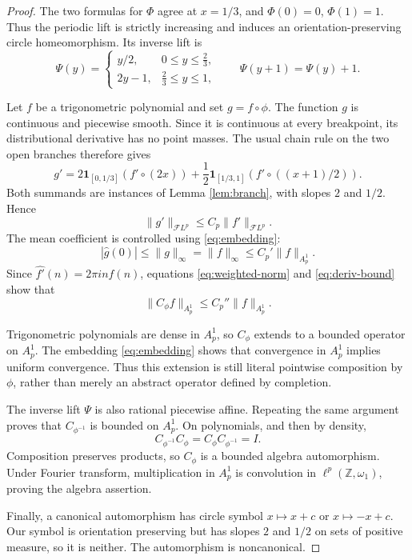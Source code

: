 \documentclass[11pt]{article}
\newcommand{\Z}{\mathbb Z}
\newcommand{\FL}{\mathcal F L}
\newcommand{\one}{\mathbf 1}
\begin{document}
\begin{proof}
The two formulas for $\Phi$ agree at $x=1/3$, and
$\Phi(0)=0$, $\Phi(1)=1$.  Thus the periodic lift is strictly increasing and
induces an orientation-preserving circle homeomorphism.  Its inverse lift is
\[
 \Psi(y)=
 \begin{cases}
   y/2,&0\le y\le \frac23,\\[1mm]
   2y-1,&\frac23\le y\le1,
 \end{cases}
 \qquad \Psi(y+1)=\Psi(y)+1.
\]

Let $f$ be a trigonometric polynomial and set $g=f\circ\phi$.  The function
$g$ is continuous and piecewise smooth.  Since it is continuous at every
breakpoint, its distributional derivative has no point masses.  The usual
chain rule on the two open branches therefore gives
\begin{equation}\label{eq:derivative}
 g'
 =2\one_{[0,1/3]}(f'\circ(2x))
  +\frac12\one_{[1/3,1]}(f'\circ((x+1)/2)).
\end{equation}
Both summands are instances of Lemma \ref{lem:branch}, with slopes $2$ and
$1/2$.  Hence
\begin{equation}\label{eq:deriv-bound}
  \|g'\|_{\FL^p}\le C_p\|f'\|_{\FL^p}.
\end{equation}
The mean coefficient is controlled using \eqref{eq:embedding}:
\[
 |\widehat g(0)|\le\|g\|_\infty=\|f\|_\infty
 \le C_p'\|f\|_{A_p^1}.
\]
Since $\widehat{f'}(n)=2\pi i n\widehat f(n)$, equations
\eqref{eq:weighted-norm} and \eqref{eq:deriv-bound} show that
\[
  \|C_\phi f\|_{A_p^1}\le C_p''\|f\|_{A_p^1}.
\]

Trigonometric polynomials are dense in $A_p^1$, so $C_\phi$ extends to a
bounded operator on $A_p^1$.  The embedding \eqref{eq:embedding} shows that
convergence in $A_p^1$ implies uniform convergence.  Thus this extension is
still literal pointwise composition by $\phi$, rather than merely an abstract
operator defined by completion.

The inverse lift $\Psi$ is also rational piecewise affine.  Repeating the same
argument proves that $C_{\phi^{-1}}$ is bounded on $A_p^1$.  On polynomials,
and then by density,
\[
 C_{\phi^{-1}}C_\phi=C_\phi C_{\phi^{-1}}=I.
\]
Composition preserves products, so $C_\phi$ is a bounded algebra
automorphism.  Under Fourier transform, multiplication in $A_p^1$ is
convolution in $\ell^p(\Z,\omega_1)$, proving the algebra assertion.

Finally, a canonical automorphism has circle symbol $x\mapsto x+c$ or
$x\mapsto -x+c$.  Our symbol is orientation preserving but has slopes $2$
and $1/2$ on sets of positive measure, so it is neither.  The automorphism is
noncanonical.
\end{proof}
\end{document}
